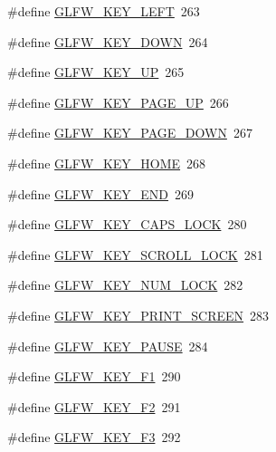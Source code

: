 \begin{DoxyCompactItemize}
\item 
\#define \mbox{\hyperlink{group__keys_gae12a010d33c309a67ab9460c51eb2462}{G\+L\+F\+W\+\_\+\+K\+E\+Y\+\_\+\+L\+E\+FT}}~263
\item 
\#define \mbox{\hyperlink{group__keys_gae2e3958c71595607416aa7bf082be2f9}{G\+L\+F\+W\+\_\+\+K\+E\+Y\+\_\+\+D\+O\+WN}}~264
\item 
\#define \mbox{\hyperlink{group__keys_ga2f3342b194020d3544c67e3506b6f144}{G\+L\+F\+W\+\_\+\+K\+E\+Y\+\_\+\+UP}}~265
\item 
\#define \mbox{\hyperlink{group__keys_ga3ab731f9622f0db280178a5f3cc6d586}{G\+L\+F\+W\+\_\+\+K\+E\+Y\+\_\+\+P\+A\+G\+E\+\_\+\+UP}}~266
\item 
\#define \mbox{\hyperlink{group__keys_gaee0a8fa442001cc2147812f84b59041c}{G\+L\+F\+W\+\_\+\+K\+E\+Y\+\_\+\+P\+A\+G\+E\+\_\+\+D\+O\+WN}}~267
\item 
\#define \mbox{\hyperlink{group__keys_ga41452c7287195d481e43207318c126a7}{G\+L\+F\+W\+\_\+\+K\+E\+Y\+\_\+\+H\+O\+ME}}~268
\item 
\#define \mbox{\hyperlink{group__keys_ga86587ea1df19a65978d3e3b8439bedd9}{G\+L\+F\+W\+\_\+\+K\+E\+Y\+\_\+\+E\+ND}}~269
\item 
\#define \mbox{\hyperlink{group__keys_ga92c1d2c9d63485f3d70f94f688d48672}{G\+L\+F\+W\+\_\+\+K\+E\+Y\+\_\+\+C\+A\+P\+S\+\_\+\+L\+O\+CK}}~280
\item 
\#define \mbox{\hyperlink{group__keys_gaf622b63b9537f7084c2ab649b8365630}{G\+L\+F\+W\+\_\+\+K\+E\+Y\+\_\+\+S\+C\+R\+O\+L\+L\+\_\+\+L\+O\+CK}}~281
\item 
\#define \mbox{\hyperlink{group__keys_ga3946edc362aeff213b2be6304296cf43}{G\+L\+F\+W\+\_\+\+K\+E\+Y\+\_\+\+N\+U\+M\+\_\+\+L\+O\+CK}}~282
\item 
\#define \mbox{\hyperlink{group__keys_gaf964c2e65e97d0cf785a5636ee8df642}{G\+L\+F\+W\+\_\+\+K\+E\+Y\+\_\+\+P\+R\+I\+N\+T\+\_\+\+S\+C\+R\+E\+EN}}~283
\item 
\#define \mbox{\hyperlink{group__keys_ga8116b9692d87382afb5849b6d8907f18}{G\+L\+F\+W\+\_\+\+K\+E\+Y\+\_\+\+P\+A\+U\+SE}}~284
\item 
\#define \mbox{\hyperlink{group__keys_gafb8d66c573acf22e364049477dcbea30}{G\+L\+F\+W\+\_\+\+K\+E\+Y\+\_\+\+F1}}~290
\item 
\#define \mbox{\hyperlink{group__keys_ga0900750aff94889b940f5e428c07daee}{G\+L\+F\+W\+\_\+\+K\+E\+Y\+\_\+\+F2}}~291
\item 
\#define \mbox{\hyperlink{group__keys_gaed7cd729c0147a551bb8b7bb36c17015}{G\+L\+F\+W\+\_\+\+K\+E\+Y\+\_\+\+F3}}~292

\end{DoxyCompactItemize}
